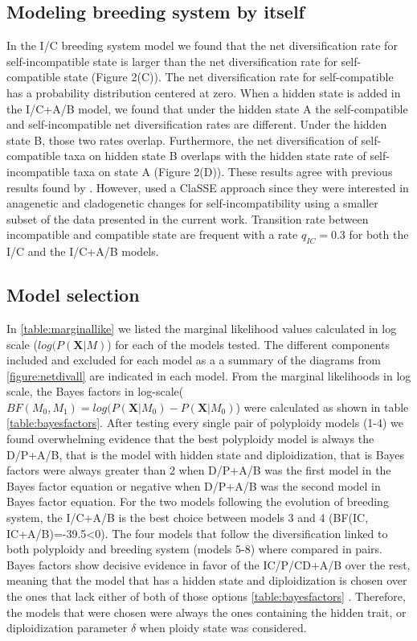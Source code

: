  
\subsection{Modeling breeding system by itself }
In the I/C breeding system model we found that the net diversification rate for self-incompatible state is larger than the net diversification rate for self-compatible state (Figure 2(C)). The net diversification rate for self-compatible has a probability distribution centered at zero.  \newline
When a hidden state is added in the I/C+A/B model, we found that under the hidden state A the self-compatible and self-incompatible net diversification rates are different. Under the hidden state B, those two rates overlap. Furthermore, the net diversification of self-compatible taxa on hidden state B overlaps with the hidden state rate of self-incompatible taxa on state A  (Figure 2(D)). These results agree with previous results found by  \citet{goldberg_2012}. However, \citet{goldberg_2012} used a ClaSSE  approach since they were interested in anagenetic and cladogenetic changes for self-incompatibility using a smaller subset of the data presented in the current work. Transition rate between incompatible and compatible state are frequent with a rate $q_{IC}=0.3$ for both the  I/C and the I/C+A/B models.

\subsection{Model selection}

In \cref{table:marginallike} we listed the marginal likelihood values calculated in log scale ($log(P(\mathbf{X}|M)$) for each of the models tested. The different components included and excluded for each model as a a summary of the diagrams from \cref{figure:netdivall} are indicated in each model. From the marginal likelihoods in log scale, the Bayes factors in log-scale($BF(M_0,M_1)=log(P(\mathbf{X}|M_0)-P(\mathbf{X}|M_0)$) were calculated as shown in table \cref{table:bayesfactors}. After testing every single pair of polyploidy models (1-4) we found overwhelming evidence that the best polyploidy model is always  the D/P+A/B, that is the model with hidden state and diploidization, that is Bayes factors were always  greater than 2 when D/P+A/B was the first model in the Bayes factor equation or negative when D/P+A/B was the second model in Bayes factor equation. \newline
For the two models following the evolution of breeding system, the I/C+A/B is the best choice between models 3 and 4 (BF(IC, IC+A/B)=-39.5<0).\newline
The four models that follow the diversification linked to both polyploidy and breeding system (models 5-8) where compared in pairs. Bayes factors show decisive evidence in favor of the  IC/P/CD+A/B over the rest, meaning that the model that has a hidden state and diploidization is chosen over the ones that lack either of both of those options \cref{table:bayesfactors} .\newline
Therefore, the models that were chosen were always the ones containing the hidden trait, or diploidization parameter $\delta$ when ploidy state was considered.


